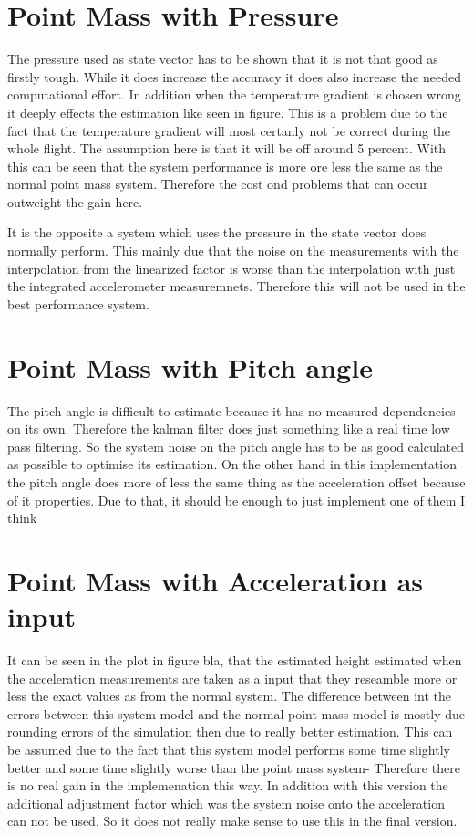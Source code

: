 \section{Point Mass with Pressure}
The pressure used as state vector has to be shown that it is not that good as firstly tough.
While it does increase the accuracy it does also increase the needed computational effort.
In addition when the temperature gradient is chosen wrong it deeply effects the estimation like seen in figure.
This is a problem due to the fact that the temperature gradient will most certanly not be correct during the whole flight.
The assumption here is that it will be off around 5 percent.
With this can be seen that the system performance is more ore less the same as the normal point mass system.
Therefore the cost ond problems that can occur outweight the gain here.


It is the opposite a system which uses the pressure in the state vector does normally perform.
This mainly due that the noise on the measurements with the interpolation from the linearized 
factor is worse than the interpolation with just the integrated accelerometer measuremnets.
Therefore this will not be used in the best performance system.


\section{Point Mass with Pitch angle}
The pitch angle is difficult to estimate because it has no measured dependencies on its own.
Therefore the kalman filter does just something like a real time low pass filtering.
So the system noise on the pitch angle has to be as good calculated as possible to optimise its estimation.
On the other hand in this implementation the pitch angle does more of less the same thing as the acceleration offset because of it properties.
Due to that, it should be enough to just implement one of them I think

\section{Point Mass with Acceleration as input}
It can be seen in the plot in figure bla, that the estimated height estimated when the acceleration measurements are taken as a input that they reseamble more or less the exact values as from the normal system.
The difference between int the errors between this system model and the normal point mass model is mostly due rounding errors of the simulation then due to really better estimation.
This can be assumed due to the fact that this system model performs some time slightly better and some time slightly worse than the point mass system-
Therefore there is no real gain in the implemenation this way.
In addition with this version the additional adjustment factor which was the system noise onto the acceleration can not be used.
So it does not really make sense to use this in the final version.

